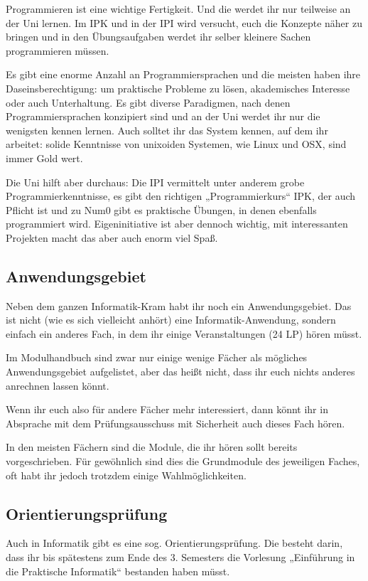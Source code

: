 Programmieren ist eine wichtige Fertigkeit. Und die werdet ihr nur teilweise an der Uni lernen. Im IPK und in der IPI wird versucht, euch die Konzepte näher zu bringen und in den Übungsaufgaben werdet ihr selber kleinere Sachen programmieren müssen.

Es gibt eine enorme Anzahl an Programmiersprachen und die meisten haben ihre Daseinsberechtigung: um praktische Probleme zu lösen, akademisches Interesse oder auch Unterhaltung. Es gibt diverse Paradigmen, nach denen Programmiersprachen konzipiert sind und an der Uni werdet ihr nur die wenigsten kennen lernen. Auch solltet ihr das System kennen, auf dem ihr arbeitet: solide Kenntnisse von unixoiden Systemen, wie Linux und OSX, sind immer Gold wert.

Die Uni hilft aber durchaus: Die IPI vermittelt unter anderem grobe Programmierkenntnisse, es gibt den richtigen „Programmierkurs“ IPK, der auch Pflicht ist und zu Num0 gibt es praktische Übungen, in denen ebenfalls programmiert wird. Eigeninitiative ist aber dennoch wichtig, mit interessanten Projekten macht das aber auch enorm viel Spaß.


\subsection{Anwendungsgebiet}

Neben dem ganzen Informatik-Kram habt ihr noch ein Anwendungsgebiet. Das ist nicht (wie es sich vielleicht anhört) eine Informatik-Anwendung, sondern einfach ein anderes Fach, in dem ihr einige Veranstaltungen (24 \gls{LP}) hören müsst.

Im Modulhandbuch sind zwar nur einige wenige Fächer als mögliches Anwendungsgebiet aufgelistet, aber das heißt nicht, dass ihr euch nichts anderes anrechnen lassen könnt.

Wenn ihr euch also für andere Fächer mehr interessiert, dann könnt ihr in Absprache mit dem Prüfungsausschuss mit Sicherheit auch dieses Fach hören.

In den meisten Fächern sind die Module, die ihr hören sollt bereits vorgeschrieben. Für gewöhnlich sind dies die Grundmodule des jeweiligen Faches, oft habt ihr jedoch trotzdem einige Wahlmöglichkeiten.


\subsection{Orientierungsprüfung}

Auch in Informatik gibt es eine sog. Orientierungsprüfung. Die besteht darin, dass ihr bis spätestens zum Ende des 3. Semesters die Vorlesung „Einführung in die Praktische Informatik“ bestanden haben müsst.


